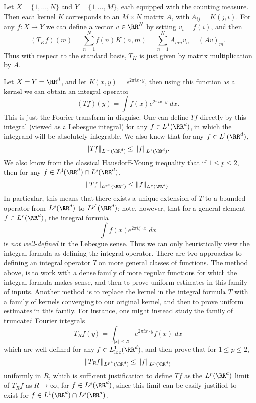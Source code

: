 \begin{example}
  Let $X = \{ 1, \dots, N \}$ and $Y = \{ 1, \dots, M \}$, each equipped with the counting measure. Then each kernel $K$ corresponds to an $M \times N$ matrix $A$, with $A_{ij} = K(j,i)$. For any $f: X \to Y$ we can define a vector $v \in \RR^N$ by setting $v_i = f(i)$, and then
  \[ (T_K f)(m) = \sum_{n = 1}^N f(n) K(n,m) = \sum_{n = 1}^N A_{mn} v_n = (Av)_m. \]
  Thus with respect to the standard basis, $T_K$ is just given by matrix multiplication by $A$.
\end{example}

\begin{example}
  Let $X = Y = \RR^d$, and let $K(x,y) = e^{2 \pi i x \cdot y}$, then using this function as a kernel we can obtain an integral operator
  \[ (T f)(y) = \int f(x) e^{2 \pi i x \cdot y}\; dx. \]
  This is just the Fourier transform in disguise. One can define $Tf$ directly by this integral (viewed as a Lebesgue integral) for any $f \in L^1(\RR^d)$, in which the integrand will be absolutely integrable. We also know that for any $f \in L^1(\RR^d)$,
  \[ \| T f \|_{L^\infty(\RR^d)} \leq \| f \|_{L^1(\RR^d)}. \]
  We also know from the classical Hausdorff-Young inequality that if $1 \leq p \leq 2$, then for any $f \in L^1(\RR^d) \cap L^p(\RR^d)$,
  \[ \| T f \|_{L^{p^*}(\RR^d)} \leq \| f \|_{L^p(\RR^d)}. \]
  In particular, this means that there exists a unique extension of $T$ to a bounded operator from $L^p(\RR^d)$ to $L^{p^*}(\RR^d)$; note, however, that for a general element $f \in L^p(\RR^d)$, the integral formula
  \[ \int f(x) e^{2 \pi i \xi \cdot x}\; dx \]
  is \emph{not well-defined} in the Lebesgue sense. Thus we can only heuristically view the integral formula as defining the integral operator. There are two approaches to defining an integral operator $T$ on more general classes of functions. The method above, is to work with a dense family of more regular functions for which the integral formula makes sense, and then to prove uniform estimates in this family of inputs. Another method is to replace the kernel in the integral formula $T$ with a family of kernels converging to our original kernel, and then to prove uniform estimates in this family. For instance, one might instead study the family of truncated Fourier integrals
  \[ T_R f(y) = \int_{|x| \leq R} e^{2 \pi i x \cdot y} f(x)\; dx \]
  which are well defined for any $f \in L^1_{\text{loc}}(\RR^d)$, and then prove that for $1 \leq p \leq 2$,
  \[ \| T_R f \|_{L^{p^*}(\RR^d)} \leq \| f \|_{L^p(\RR^d)} \]
  uniformly in $R$, which is sufficient justification to define $Tf$ as the $L^p(\RR^d)$ limit of $T_R f$ as $R \to \infty$, for $f \in L^p(\RR^d)$, since this limit can be easily justified to exist for $f \in L^1(\RR^d) \cap L^p(\RR^d)$.
\end{example}








